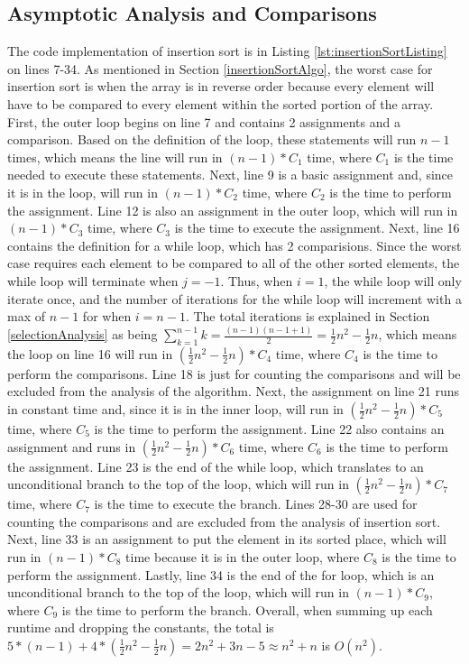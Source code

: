 \documentclass[letterpaper, 10pt,DIV=13]{scrartcl}
\numberwithin{equation}{section} %
\numberwithin{figure}{section} %
\numberwithin{table}{section} %
\begin{document}
\subsection{Asymptotic Analysis and Comparisons}\label{insertionAnalysis}
The code implementation of insertion sort is in Listing \ref{lst:insertionSortListing} on lines 7-34. As mentioned in Section \ref{insertionSortAlgo}, the worst case for insertion sort is when the array is in reverse order because every element will have to be compared to every element within the sorted portion of the array. First, the outer loop begins on line 7 and contains 2 assignments and a comparison. Based on the definition of the loop, these statements will run $n - 1$ times, which means the line will run in $(n - 1) * C_{1}$ time, where $C_{1}$ is the time needed to execute these statements. Next, line 9 is a basic assignment and, since it is in the loop, will run in $(n - 1) * C_{2}$ time, where $C_{2}$ is the time to perform the assignment. Line 12 is also an assignment in the outer loop, which will run in $(n - 1) * C_{3}$ time, where $C_{3}$ is the time to execute the assignment. Next, line 16 contains the definition for a while loop, which has 2 comparisions. Since the worst case requires each element to be compared to all of the other sorted elements, the while loop will terminate when $j = -1$. Thus, when $i = 1$, the while loop will only iterate once, and the number of iterations for the while loop will increment with a max of $n - 1$ for when $i = n - 1$. The total iterations is explained in Section \ref{selectionAnalysis} as being $\sum_{k = 1} ^{n - 1} k = \frac{(n - 1)(n - 1 + 1)}{2} = \frac{1}{2}n^2 - \frac{1}{2}n$, which means the loop on line 16 will run in $(\frac{1}{2}n^2 - \frac{1}{2}n) * C_{4}$ time, where $C_{4}$ is the time to perform the comparisons. Line 18 is just for counting the comparisons and will be excluded from the analysis of the algorithm. Next, the assignment on line 21 runs in constant time and, since it is in the inner loop, will run in $(\frac{1}{2}n^2 - \frac{1}{2}n) * C_{5}$ time, where $C_{5}$ is the time to perform the assignment. Line 22 also contains an assignment and runs in $(\frac{1}{2}n^2 - \frac{1}{2}n) * C_{6}$ time, where $C_{6}$ is the time to perform the assignment. Line 23 is the end of the while loop, which translates to an unconditional branch to the top of the loop, which will run in $(\frac{1}{2}n^2 - \frac{1}{2}n) * C_{7}$ time, where $C_{7}$ is the time to execute the branch. Lines 28-30 are used for counting the comparisons and are excluded from the analysis of insertion sort. Next, line 33 is an assignment to put the element in its sorted place, which will run in $(n - 1) * C_{8}$ time because it is in the outer loop, where $C_{8}$ is the time to perform the assignment. Lastly, line 34 is the end of the for loop, which is an unconditional branch to the top of the loop, which will run in $(n - 1) * C_{9}$, where $C_{9}$ is the time to perform the branch. Overall, when summing up each runtime and dropping the constants, the total is $5 * (n - 1) + 4 * (\frac{1}{2}n^2 - \frac{1}{2}n) = 2n^2 + 3n - 5 \approx n^2 + n$ is $O(n^2)$.
\end{document}
